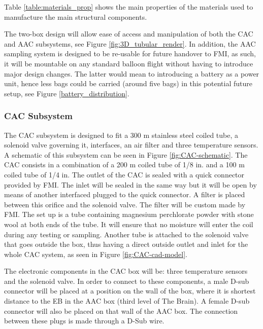 Table \ref{table:materials_prop} shows the main properties of the materials used to manufacture the main structural components.



The two-box design will allow ease of access and manipulation of both the CAC and AAC subsystems, see Figure \ref{fig:3D_tubular_render}. In addition, the AAC sampling system is designed to be re-usable for future handover to FMI, as such, it will be mountable on any standard balloon flight without having to introduce major design changes. The latter would mean to introducing a battery as a power unit, hence less bags could be carried (around five bags) in this potential future setup, see Figure \ref{battery_distribution}.




\pagebreak
\subsubsection{CAC Subsystem}

The CAC subsystem is designed to fit a 300 m stainless steel coiled tube, a solenoid valve governing it, interfaces, an air filter and three temperature sensors. A schematic of this subsystem can be seen in Figure \ref{fig:CAC-schematic}. The CAC consists in a combination of a 200 m coiled tube of 1/8 in. and a 100 m coiled tube of 1/4 in. The outlet of the CAC is sealed with a quick connector provided by FMI. The inlet will be sealed in the same way but it will be open by means of another interfaced plugged to the quick connector. A filter is placed between this orifice and the solenoid valve. The filter will be custom made by FMI. The set up is a tube containing magnesium perchlorate powder with stone wool at both ends of the tube. It will ensure that no moisture will enter the coil during any testing or sampling. Another tube is attached to the solenoid valve that goes outside the box, thus having a direct outside outlet and inlet for the whole CAC system, as seen in Figure \ref{fig:CAC-cad-model}.

\smallskip
The electronic components in the CAC box will be: three temperature sensors and the solenoid valve. In order to connect to these components, a male D-sub connector will be placed at a position on the wall of the box, where it is shortest distance to the EB in the AAC box (third level of The Brain). A female D-sub connector will also be placed on that wall of the AAC box. The connection between these plugs is made through a D-Sub wire. 

